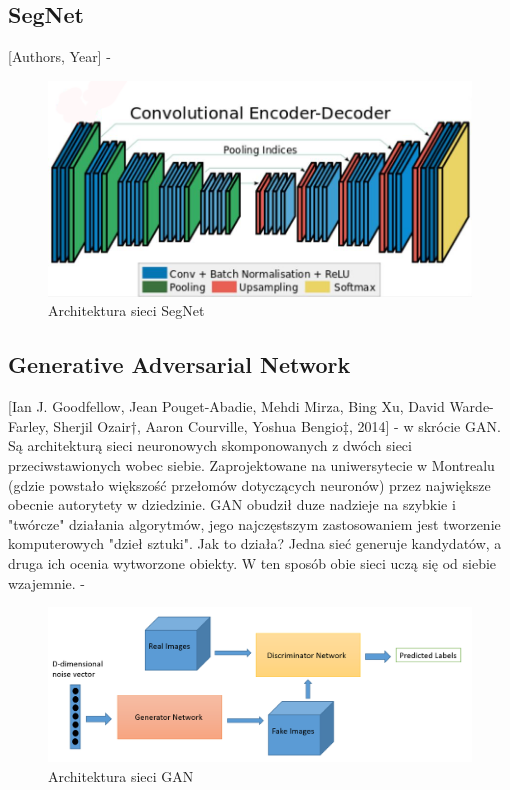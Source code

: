\documentclass[12pt,a4paper,twoside,titlepage,openright]{book}
\begin{document}
\subsection{SegNet}
[Authors, Year] - \cite{DBLP:journals/corr/BadrinarayananH15}
\begin{figure}[h]
	\centering
			\includegraphics[resolution=120]{SegNet.png}
		\caption{Architektura sieci SegNet}
\end{figure}

\subsection{Generative Adversarial Network}
[Ian J. Goodfellow, Jean Pouget-Abadie, Mehdi Mirza, Bing Xu, David Warde-Farley, Sherjil Ozair†, Aaron Courville, Yoshua Bengio‡, 2014] - w skrócie GAN. Są architekturą sieci neuronowych skomponowanych z dwóch sieci przeciwstawionych wobec siebie. Zaprojektowane na uniwersytecie w Montrealu (gdzie powstało większość przełomów dotyczących neuronów) przez największe obecnie autorytety w dziedzinie. GAN obudził duze nadzieje na szybkie i "twórcze" działania algorytmów, jego najczęstszym zastosowaniem jest tworzenie komputerowych "dzieł sztuki". Jak to działa? Jedna sieć generuje kandydatów, a druga ich ocenia wytworzone obiekty. W ten sposób obie sieci uczą się od siebie wzajemnie. - \cite{NIPS2014_5423}
\begin{figure}[h]
	\centering
			\includegraphics[resolution=120]{GAN.png}
		\caption{Architektura sieci GAN}
\end{figure}
\end{document}
